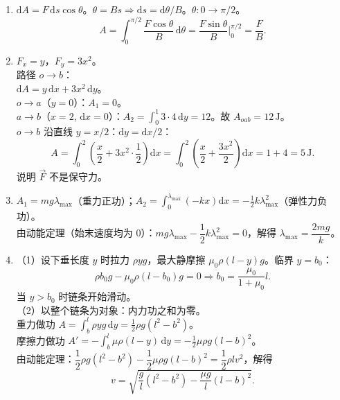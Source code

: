 \documentclass[12pt]{article}
\begin{document}
\begin{enumerate}[label=\textbf{例\arabic*.}, leftmargin=*]
\item $\mathrm{d}A = F\,\mathrm{d}s\cos\theta$。$\theta = Bs \Rightarrow \mathrm{d}s = \mathrm{d}\theta/B$。$\theta: 0 \to \pi/2$。
\[
  A = \int_0^{\pi/2} \frac{F\cos\theta}{B}\,\mathrm{d}\theta = \frac{F\sin\theta}{B}\Big|_0^{\pi/2} = \frac{F}{B}.
\]

\item $F_x = y$，$F_y = 3x^2$。\\
路径 $o \to b$：\\
$\mathrm{d}A = y\,\mathrm{d}x + 3x^2\,\mathrm{d}y$。\\
$o \to a$（$y=0$）：$A_1 = 0$。\\
$a \to b$（$x=2$, $\mathrm{d}x=0$）：$A_2 = \int_0^1 3\cdot 4\,\mathrm{d}y = 12$。故 $A_{oab} = 12\,\mathrm{J}$。\\
$o \to b$ 沿直线 $y = x/2$：$\mathrm{d}y = \mathrm{d}x/2$：
\[
  A = \int_0^2 \left(\frac{x}{2} + 3x^2\cdot\frac{1}{2}\right)\mathrm{d}x = \int_0^2 \left(\frac{x}{2} + \frac{3x^2}{2}\right)\mathrm{d}x = 1 + 4 = 5\,\mathrm{J}.
\]
说明 $\vec{F}$ 不是保守力。

\item $A_1 = mg\lambda_{\max}$（重力正功）；$A_2 = \displaystyle\int_0^{\lambda_{\max}}(-kx)\mathrm{d}x = -\frac{1}{2}k\lambda_{\max}^2$（弹性力负功）。\\
由动能定理（始末速度均为 0）：$mg\lambda_{\max} - \dfrac{1}{2}k\lambda_{\max}^2 = 0$，解得 $\lambda_{\max} = \dfrac{2mg}{k}$。

\item（1）设下垂长度 $y$ 时拉力 $\rho y g$，最大静摩擦 $\mu_0\rho(l - y)g$。临界 $y = b_0$：
\[
  \rho b_0 g - \mu_0\rho(l - b_0)g = 0 \Rightarrow b_0 = \frac{\mu_0}{1+\mu_0}l.
\]
当 $y > b_0$ 时链条开始滑动。\\
（2）以整个链条为对象：内力功之和为零。\\
重力做功 $A = \displaystyle\int_b^l \rho y g\,\mathrm{d}y = \frac{1}{2}\rho g(l^2 - b^2)$。\\
摩擦力做功 $A' = -\displaystyle\int_b^l \mu\rho(l - y)\,\mathrm{d}y = -\frac{1}{2}\mu\rho g(l - b)^2$。\\
由动能定理：$\dfrac{1}{2}\rho g(l^2 - b^2) - \dfrac{1}{2}\mu\rho g(l - b)^2 = \dfrac{1}{2}\rho l v^2$，解得
\[
  v = \sqrt{\frac{g}{l}(l^2 - b^2) - \frac{\mu g}{l}(l - b)^2}.
\]


\end{enumerate}
\end{document}
